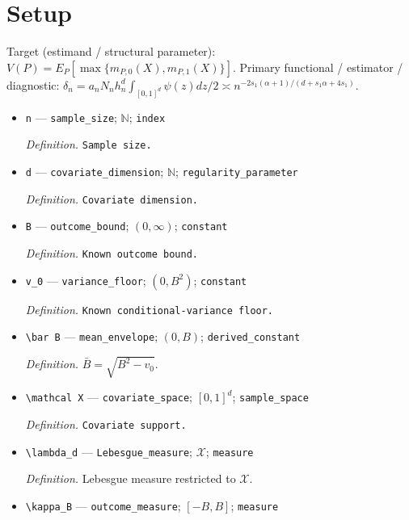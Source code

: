 \documentclass{article}
\begin{document}
\section{Setup}

Target (estimand / structural parameter): \(V(P)=E_P[\max\{m_{P,0}(X),m_{P,1}(X)\}]\).
Primary functional / estimator / diagnostic: \(\delta_n=a_nN_nh_n^d\int_{[0,1]^d}\psi(z)dz/2\asymp n^{-2s_1(\alpha+1)/(d+s_1\alpha+4s_1)}\).
\begin{itemize}
  \item \texttt{n} --- \texttt{sample\_\allowbreak{}size}; \(\mathbb N\); \texttt{index}
  \par\smallskip\noindent\emph{Definition.} \texttt{Sample size.}
  \item \texttt{d} --- \texttt{covariate\_\allowbreak{}dimension}; \(\mathbb N\); \texttt{regularity\_\allowbreak{}parameter}
  \par\smallskip\noindent\emph{Definition.} \texttt{Covariate dimension.}
  \item \texttt{B} --- \texttt{outcome\_\allowbreak{}bound}; \((0,\infty)\); \texttt{constant}
  \par\smallskip\noindent\emph{Definition.} \texttt{Known outcome bound.}
  \item \texttt{v\_\allowbreak{}0} --- \texttt{variance\_\allowbreak{}floor}; \((0,B^2)\); \texttt{constant}
  \par\smallskip\noindent\emph{Definition.} \texttt{Known conditional-\allowbreak{}variance floor.}
  \item \texttt{\textbackslash{}\allowbreak{}bar B} --- \texttt{mean\_\allowbreak{}envelope}; \((0,B)\); \texttt{derived\_\allowbreak{}constant}
  \par\smallskip\noindent\emph{Definition.} \(\bar B=\sqrt{B^2-v_0}\).
  \item \texttt{\textbackslash{}\allowbreak{}mathcal X} --- \texttt{covariate\_\allowbreak{}space}; \([0,1]^d\); \texttt{sample\_\allowbreak{}space}
  \par\smallskip\noindent\emph{Definition.} \texttt{Covariate support.}
  \item \texttt{\textbackslash{}\allowbreak{}lambda\_\allowbreak{}d} --- \texttt{Lebesgue\_\allowbreak{}measure}; \(\mathcal X\); \texttt{measure}
  \par\smallskip\noindent\emph{Definition.} Lebesgue measure restricted to \(\mathcal X\).
  \item \texttt{\textbackslash{}\allowbreak{}kappa\_\allowbreak{}B} --- \texttt{outcome\_\allowbreak{}measure}; \([-B,B]\); \texttt{measure}

\end{itemize}
\end{document}
